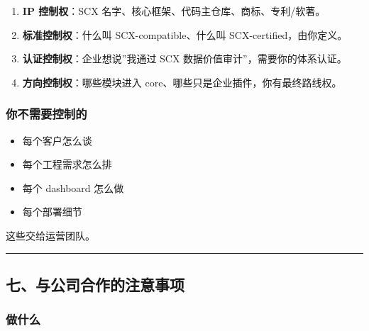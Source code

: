 \documentclass[
  12pt,
]{ctexart}
\providecommand{\tightlist}{%
  \setlength{\itemsep}{0pt}\setlength{\parskip}{0pt}}
\begin{document}
\begin{enumerate}
\def\labelenumi{\arabic{enumi}.}
\tightlist
\item
  \textbf{IP 控制权}：SCX 名字、核心框架、代码主仓库、商标、专利/软著。
\item
  \textbf{标准控制权}：什么叫 SCX-compatible、什么叫
  SCX-certified，由你定义。
\item
  \textbf{认证控制权}：企业想说''我通过 SCX
  数据价值审计''，需要你的体系认证。
\item
  \textbf{方向控制权}：哪些模块进入
  core、哪些只是企业插件，你有最终路线权。
\end{enumerate}

\subsubsection{你不需要控制的}\label{ux4f60ux4e0dux9700ux8981ux63a7ux5236ux7684}

\begin{itemize}
\tightlist
\item
  每个客户怎么谈
\item
  每个工程需求怎么排
\item
  每个 dashboard 怎么做
\item
  每个部署细节
\end{itemize}

这些交给运营团队。

\begin{center}\rule{0.5\linewidth}{0.5pt}\end{center}

\subsection{七、与公司合作的注意事项}\label{ux4e03ux4e0eux516cux53f8ux5408ux4f5cux7684ux6ce8ux610fux4e8bux9879}

\subsubsection{做什么}\label{ux505aux4ec0ux4e48-2}
\end{document}
